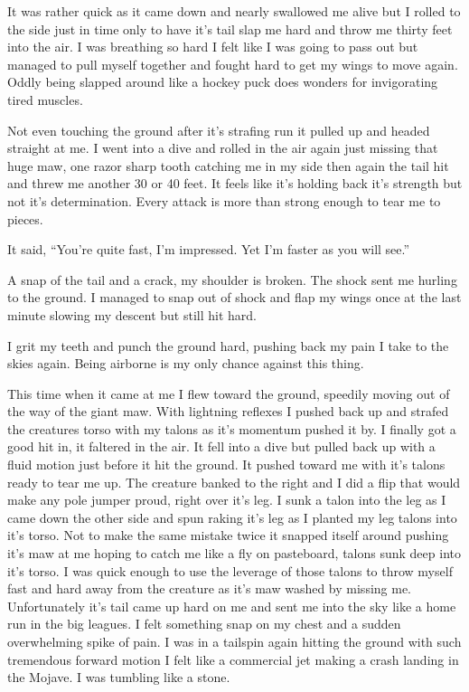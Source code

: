 \parasep{}

It was rather quick as it came down and nearly swallowed me alive but I rolled to the side just in time only to have it's tail slap me hard and throw me thirty feet into the air. I was breathing so hard I felt like I was going to pass out but managed to pull myself together and fought hard to get my wings to move again. Oddly being slapped around like a hockey puck does wonders for invigorating tired muscles. 

Not even touching the ground after it's strafing run it pulled up and headed straight at me. I went into a dive and rolled in the air again just missing that huge maw, one razor sharp tooth catching me in my side then again the tail hit and threw me another 30 or 40 feet. It feels like it's holding back it's strength but not it's determination. Every attack is more than strong enough to tear me to pieces.

It said, ``You're quite fast, I'm impressed. Yet I'm faster as you will see.''

A snap of the tail and a crack, my shoulder is broken. The shock sent me hurling to the ground. I managed to snap out of shock and flap my wings once at the last minute slowing my descent but still hit hard.

I grit my teeth and punch the ground hard, pushing back my pain I take to the skies again. Being airborne is my only chance against this thing.

This time when it came at me I flew toward the ground, speedily moving out of the way of the giant maw. With lightning reflexes I pushed back up and strafed the creatures torso with my talons as it's momentum pushed it by. I finally got a good hit in, it faltered in the air. It fell into a dive but pulled back up with a fluid motion just before it hit the ground. It pushed toward me with it's talons ready to tear me up. The creature banked to the right and I did a flip that would make any pole jumper proud, right over it's leg. I sunk a talon into the leg as I came down the other side and spun raking it's leg as I planted my leg talons into it's torso. Not to make the same mistake twice it snapped itself around pushing it's maw at me hoping to catch me like a fly on pasteboard, talons sunk deep into it's torso. I was quick enough to use the leverage of those talons to throw myself fast and hard away from the creature as it's maw washed by missing me. Unfortunately it's tail came up hard on me and sent me into the sky like a home run in the big leagues. I felt something snap on my chest and a sudden overwhelming spike of pain. I was in a tailspin again hitting the ground with such tremendous forward motion I felt like a commercial jet making a crash landing in the Mojave. I was tumbling like a stone.

